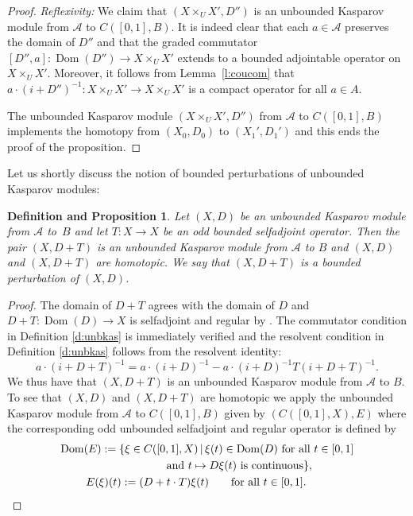\documentclass[11pt]{article}
\numberwithin{equation}{section}
\newtheorem{dfnprop}[Theorem]{Definition and Proposition}
\newcommand{\cd}{\cdot}
\newcommand{\ti}{\times}
\newcommand{\s}[1]{\mathscr{#1}}
\begin{document}
\begin{proof}{\it Reflexivity:}
We claim that $(X \ti_U X',D'')$ is an unbounded Kasparov module from $\s A$ to $C([0,1],B)$. It is indeed clear that each $a \in \s A$ preserves the domain of $D''$ and that the graded commutator $[ D'', a ]\colon \operatorname{Dom}(D'') \to X \ti_U X'$ extends to a bounded adjointable operator on $X \ti_U X'$. Moreover, it follows from Lemma~\ref{l:coucom} that $a \cd (i + D'')^{-1}\colon X \ti_U X' \to X \ti_U X'$ is a compact operator for all $a \in A$.

The unbounded Kasparov module $(X \ti_U X',D'')$ from $\s A$ to $C( [0,1],B)$ implements the homotopy from $(X_0, D_0)$ to $(X_1',D_1')$ and this ends the proof of the proposition.
\end{proof}


Let us shortly discuss the notion of bounded perturbations of unbounded Kasparov modules:

\begin{dfnprop}\label{p:bddper}
Let $(X,D)$ be an unbounded Kasparov module from $\s A$ to~$B$ and let $T\colon X \to X$ be an odd bounded selfadjoint operator. Then the pair $(X, D + T)$ is an unbounded Kasparov module from $\s A$ to $B$ and $(X,D)$ and $(X, D + T)$ are homotopic. We say that $(X, D + T)$ is a \emph{bounded perturbation} of $(X,D)$.
\end{dfnprop}
\begin{proof}
The domain of $D + T$ agrees with the domain of $D$ and $D + T\colon \operatorname{Dom}(D) \to X$ is selfadjoint and regular by \cite[Example 1]{Wor:UAQ}. The commutator condition in Definition \ref{d:unbkas} is immediately verified and the resolvent condition in Definition \ref{d:unbkas} follows from the resolvent identity:
\[
a \cd (i + D + T)^{-1} = a \cd (i + D)^{-1} - a \cd (i + D)^{-1} T (i + D + T)^{-1} .
\]
We thus have that $(X, D + T)$ is an unbounded Kasparov module from $\s A$ to $B$. To see that $(X,D)$ and $(X, D + T)$ are homotopic we apply the unbounded Kasparov module from $\s A$ to $C( [0,1],B)$ given by $( C( [0,1],X), E)$ where the corresponding odd unbounded selfadjoint and regular operator is defined by
\begin{gather*}
\operatorname{Dom}(E) := \{ \xi \in C( [0,1],X) \,|\, \xi(t) \in \operatorname{Dom}(D) \ \text{for all} \ t \in [0,1] \\
\hphantom{\operatorname{Dom}(E) := \{}{} \text{and} \ t \mapsto D \xi(t) \ \text{is continuous} \},\\
E(\xi)(t) := (D + t \cd T)\xi(t) \qquad \text{for all } t \in [0,1] . \tag*{\qed}
\end{gather*}\renewcommand{\qed}{}
\end{proof}
\end{document}

